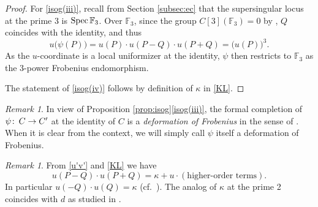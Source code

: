 \documentclass{gtpart}
\theoremstyle{definition}
\theoremstyle{remark}
\newtheorem{rmk}[thm]{Remark}
\def\co{\colon\thinspace}
\newcommand{\mb}[1]{\mathbb{#1}}
\newcommand{\Spec}{{\rm Spec\thinspace}}
\newcommand{\BF}{{\mb F}}
\newcommand{\K}{\kappa}
\newcommand{\isog}[1]{Proposition \ref{prop:isog}\thinspace \eqref{isog(#1)}}
\begin{document}
\begin{proof}
 For \eqref{isog(iii)}, recall from Section \ref{subsec:ec} that the 
 supersingular locus at the prime 3 is $\Spec \BF_3$.  Over $\BF_3$, 
 since the group $C[3](\BF_3) = 0$ by \cite[V.3.1a]{AEC}, $Q$ coincides 
 with the identity, and thus 
 \[
  u\big( \psi(P) \big) = u(P) \cdot u(P-Q) \cdot u(P+Q) = \big( u(P) \big)^3.  
 \]
 As the $u$-coordinate is a local uniformizer at the identity, $\psi$ 
 then restricts to $\BF_3$ as the 3-power Frobenius endomorphism.  

 The statement of \eqref{isog(iv)} follows by definition of $\K$ in 
 \eqref{KL}.  
\end{proof}

\begin{rmk}
 In view of \isog{iii}, the formal completion of $\psi \co C \to C'$ at 
 the identity of $C$ is a {\em deformation of Frobenius} in the sense of 
 \cite[11.3]{cong}.  When it is clear from the context, we will simply 
 call $\psi$ itself a deformation of Frobenius.  
\end{rmk}

\begin{rmk}
\label{rmk:K}
 From \eqref{u'v'} and \eqref{KL} we have 
 \begin{equation}
 \label{norm}
  u(P-Q) \cdot u(P+Q) = \K + u \cdot (\text{higher-order terms}).  
 \end{equation}
 In particular $u(-Q) \cdot u(Q) = \K$ 
 (cf.~\cite[Proposition 7.5.2 and Section 7.7]{KM}).  The analog of $\K$ 
 at the prime 2 coincides with $d$ as studied in \cite[Section 3]{h2p2}.  
\end{rmk}
\end{document}
